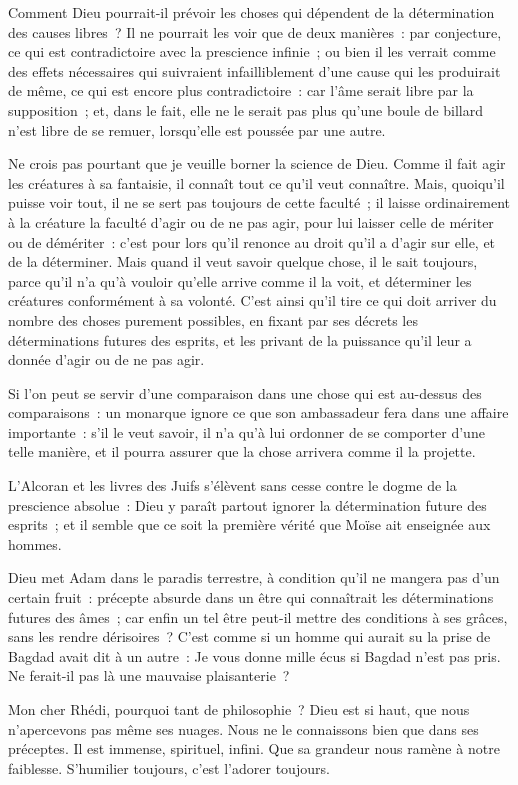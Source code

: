 \documentclass[french,twoside]{book} %
\begin{document}
Comment Dieu pourrait-il prévoir les choses qui dépendent de la détermination des causes libres ? Il ne pourrait les voir que de deux manières : par conjecture, ce qui est contradictoire avec la prescience infinie ; ou bien il les verrait comme des effets nécessaires qui suivraient infailliblement d’une cause qui les produirait de même, ce qui est encore plus contradictoire : car l’âme serait libre par la supposition ; et, dans le fait, elle ne le serait pas plus qu’une boule de billard n’est libre de se remuer, lorsqu’elle est poussée par une autre.\par
Ne crois pas pourtant que je veuille borner la science de Dieu. Comme il fait agir les créatures à sa fantaisie, il connaît tout ce qu’il veut connaître. Mais, quoiqu’il puisse voir tout, il ne se sert pas toujours de cette faculté ; il laisse ordinairement à la créature la faculté d’agir ou de ne pas agir, pour lui laisser celle de mériter ou de démériter : c’est pour lors qu’il renonce au droit qu’il a d’agir sur elle, et de la déterminer. Mais quand il veut savoir quelque chose, il le sait toujours, parce qu’il n’a qu’à vouloir qu’elle arrive comme il la voit, et déterminer les créatures conformément à sa volonté. C’est ainsi qu’il tire ce qui doit arriver du nombre des choses purement possibles, en fixant par ses décrets les déterminations futures des esprits, et les privant de la puissance qu’il leur a donnée d’agir ou de ne pas agir.\par
Si l’on peut se servir d’une comparaison dans une chose qui est au-dessus des comparaisons : un monarque ignore ce que son ambassadeur fera dans une affaire importante : s’il le veut savoir, il n’a qu’à lui ordonner de se comporter d’une telle manière, et il pourra assurer que la chose arrivera comme il la projette.\par
L’Alcoran et les livres des Juifs s’élèvent sans cesse contre le dogme de la prescience absolue : Dieu y paraît partout ignorer la détermination future des esprits ; et il semble que ce soit la première vérité que Moïse ait enseignée aux hommes.\par
Dieu met Adam dans le paradis terrestre, à condition qu’il ne mangera pas d’un certain fruit : précepte absurde dans un être qui connaîtrait les déterminations futures des âmes ; car enfin un tel être peut-il mettre des conditions à ses grâces, sans les rendre dérisoires ? C’est comme si un homme qui aurait su la prise de Bagdad avait dit à un autre : Je vous donne mille écus si Bagdad n’est pas pris. Ne ferait-il pas là une mauvaise plaisanterie ?\par
Mon cher Rhédi, pourquoi tant de philosophie ? Dieu est si haut, que nous n’apercevons pas même ses nuages. Nous ne le connaissons bien que dans ses préceptes. Il est immense, spirituel, infini. Que sa grandeur nous ramène à notre faiblesse. S’humilier toujours, c’est l’adorer toujours.\par
\end{document}
